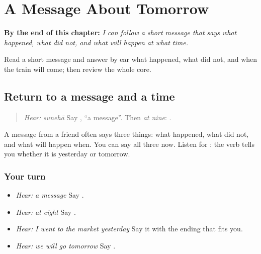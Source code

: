 
\chapter{A Message About Tomorrow}
\label{ch:pa-a2-message}

\begin{chapteropening}
\textbf{By the end of this chapter:} \emph{I can follow a short message that says what happened, what did not, and what will happen at what time.}

Read a short message and answer by ear what happened, what did not, and when the train will come; then review the whole core.
\end{chapteropening}

\section[\texorpdfstring{\pa{ਸੁਨੇਹਾ} · \pa{ਨੌਂ} \pa{ਵਜੇ} (sunehā · nauṁ vaje)}{ਸੁਨੇਹਾ · ਨੌਂ ਵਜੇ (sunehā · nauṁ vaje)}]{Return to a message and a time}

\label{lesson:PA-C224-message-return}



\begin{quote}
\emph{Hear:} \emph{sunehā} Say \textbf{}, \textquotedblleft{}a message\textquotedblright{}. Then \emph{at nine}: \textbf{ }.
\end{quote}

\begin{grammarlens}[title={Grammar Lens}]
A message from a friend often says three things: what happened, what did not, and what will happen when. You can say all three now. Listen for \textbf{}: the verb tells you whether it is yesterday or tomorrow.
\end{grammarlens}

\subsection*{Your turn}
\begin{itemize}
\raggedright
  \item \emph{Hear:} \emph{a message} Say \textbf{}.
  \item \emph{Hear:} \emph{at eight} Say \textbf{ }.
  \item \emph{Hear:} \emph{I went to the market yesterday} Say it with the ending that fits you.
  \item \emph{Hear:} \emph{we will go tomorrow} Say \textbf{  }.
\end{itemize}

